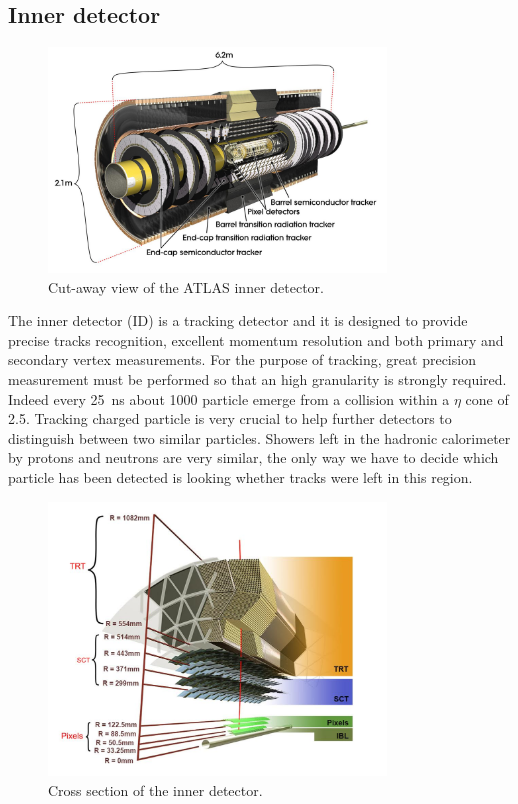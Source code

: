 \subsection{Inner detector}
\label{sec:ID}
\begin{figure}[tp]
\centering
\includegraphics[width=0.8\textwidth]{LHC_ATLAS/ID}
\caption{Cut-away view of the ATLAS inner detector.}
\end{figure}

The inner detector (ID) is a tracking detector and it is designed to provide precise tracks recognition, excellent momentum resolution and both primary and secondary vertex measurements. For the purpose of tracking, great precision measurement must be performed so that an high granularity is strongly required. Indeed every \SI{25}{\ns} about \num{1000} particle emerge from a collision within a $\eta$ cone of \num{2.5}. Tracking charged particle is very crucial to help further detectors to distinguish between two similar particles. Showers left in the hadronic calorimeter by protons and neutrons are very similar, the only way we have to decide which particle has been detected is looking whether tracks were left in this region.

\begin{figure}[pt]
\centering
\includegraphics[width=0.8\textwidth]{LHC_ATLAS/IDCrossSection}
\caption{Cross section of the inner detector.}
\end{figure}

